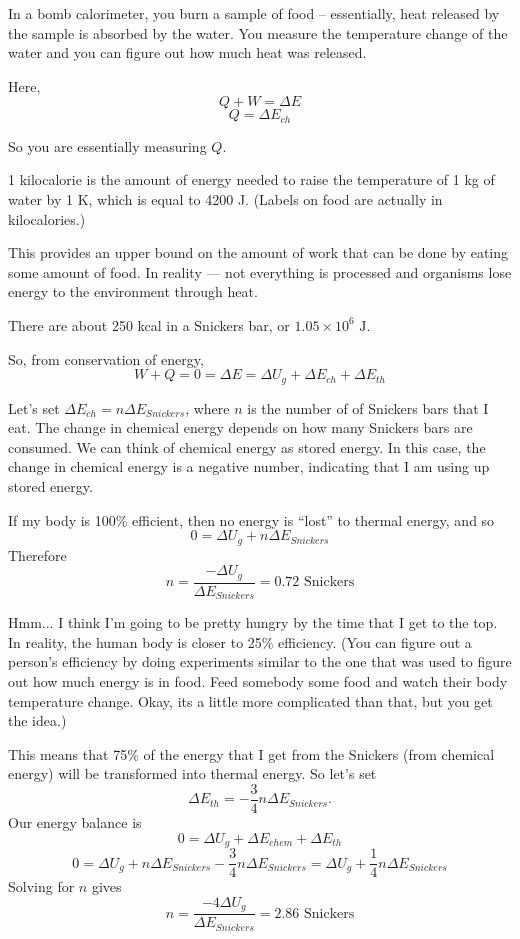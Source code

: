 In a bomb calorimeter, you burn a sample of food -- essentially, heat released by the sample is absorbed by the water. You measure the temperature change of the water and you can figure out how much heat was released.

Here,
$$Q+W=\Delta{E}$$
$$Q=\Delta{E_{ch}}$$

So you are essentially measuring $Q$.

1 kilocalorie is the amount of energy needed to raise the temperature of 1 kg of water by 1 K, which is equal to 4200 J. (Labels on food are actually in kilocalories.)

This provides an upper bound on the amount of work that can be done by eating some amount of food. In reality --- not everything is processed and organisms lose energy to the environment through heat.

There are about 250 kcal in a Snickers bar, or $1.05\times 10^6\mbox{ J}$. 

So, from conservation of energy,
$$W+Q=0=\Delta{E}=\Delta{U_g}+\Delta{E_{ch}}+\Delta{E_{th}}$$

Let's set $\Delta{E_{ch}}=n\Delta{E_{Snickers}}$, where $n$ is the number of of Snickers bars that I eat. The change in chemical energy depends on how many Snickers bars are consumed. We can think of chemical energy as stored energy. In this case, the change in chemical energy is a negative number, indicating that I am using up stored energy.

If my body is 100\% efficient, then no energy is ``lost'' to thermal energy, and so 
$$0=\Delta{U_g}+n\Delta{E_{Snickers}}$$
Therefore
$$n=\frac{-\Delta{U_g}}{\Delta{E_{Snickers}}}=0.72\mbox{ Snickers}$$

Hmm... I think I'm going to be pretty hungry by the time that I get to the top. In reality, the human body is closer to 25\% efficiency. (You can figure out a person's efficiency by doing experiments similar to the one that was used to figure out how much energy is in food. Feed somebody some food and watch their body temperature change. Okay, its a little more complicated than that, but you get the idea.)

This means that 75\% of the energy that I get from the Snickers (from chemical energy) will be transformed into thermal energy. So let's set
$$\Delta{E_{th}}=-\frac{3}{4}n\Delta{E_{Snickers}}.$$
Our energy balance is
$$0=\Delta{U_g}+\Delta{E_{chem}}+\Delta{E_{th}}$$
$$0=\Delta{U_g}+n\Delta{E_{Snickers}}-\frac{3}{4}n\Delta{E_{Snickers}}=\Delta{U_g}+\frac{1}{4}n\Delta{E_{Snickers}}$$
Solving for $n$ gives
$$n=\frac{-4\Delta{U_g}}{\Delta{E_{Snickers}}}=\boxed{2.86\mbox{ Snickers}}$$


